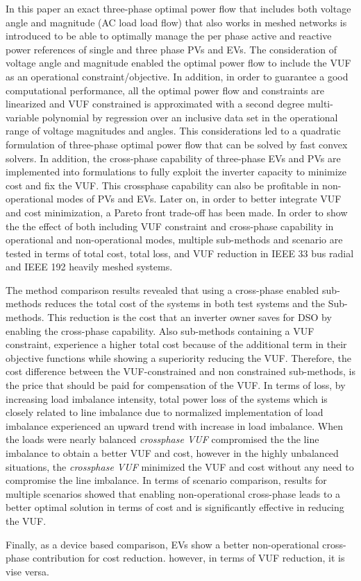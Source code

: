 \documentclass[journal]{IEEEtran}
\begin{document}
In this paper an exact three-phase optimal power flow that includes both voltage angle and magnitude (AC load load flow) that also works in meshed networks is introduced to be able to optimally manage the per phase active and reactive power references of single and three phase PVs and EVs. The consideration of voltage angle and magnitude enabled the optimal power flow to include the VUF as an operational constraint/objective. In addition, in order to guarantee a good computational performance, all the optimal power flow and constraints are linearized and VUF constrained is approximated with a second degree multi-variable polynomial by regression over an inclusive data set in the operational range of voltage magnitudes and angles. This considerations led to a quadratic formulation of three-phase optimal power flow that can be solved by fast convex solvers. In addition, the cross-phase capability of three-phase EVs and PVs are implemented into formulations to fully exploit the inverter capacity to minimize cost and fix the VUF. This crossphase capability can also be profitable in non-operational modes of PVs and EVs.  Later on, in order to better integrate VUF and cost minimization, a Pareto front trade-off has been made. In order to show the the effect of both including VUF constraint and cross-phase capability in operational and non-operational modes, multiple sub-methods and scenario are tested in terms of total cost, total loss, and VUF reduction in IEEE 33 bus radial and IEEE 192 heavily meshed systems.

The method comparison results revealed that using a cross-phase enabled sub-methods reduces the total cost of the systems in both test systems and the Sub-methods. This reduction is the cost that an inverter owner saves for DSO by enabling the cross-phase capability. Also sub-methods containing a VUF constraint, experience a higher total cost because of the additional term in their objective functions while showing a superiority reducing the VUF. Therefore, the cost difference between the VUF-constrained and non constrained sub-methods, is the price that should be paid for compensation of the VUF. In terms of loss, by increasing load imbalance intensity, total power loss of the systems which is closely related to line imbalance due to normalized implementation of load imbalance experienced an upward trend with increase in load imbalance. When the loads were nearly balanced \textit{crossphase VUF} compromised the the line imbalance to obtain a better VUF and cost, however in the
highly unbalanced situations, the \textit{crossphase VUF} minimized
the VUF and cost without any need to compromise the line imbalance. In terms of scenario comparison, results for multiple scenarios showed that enabling non-operational cross-phase leads to a better optimal solution in terms of cost and is significantly effective in reducing the VUF. 

Finally, as a device based comparison, EVs show a better non-operational cross-phase contribution for cost reduction. however, in terms of VUF reduction, it is vise versa.




\end{document}
